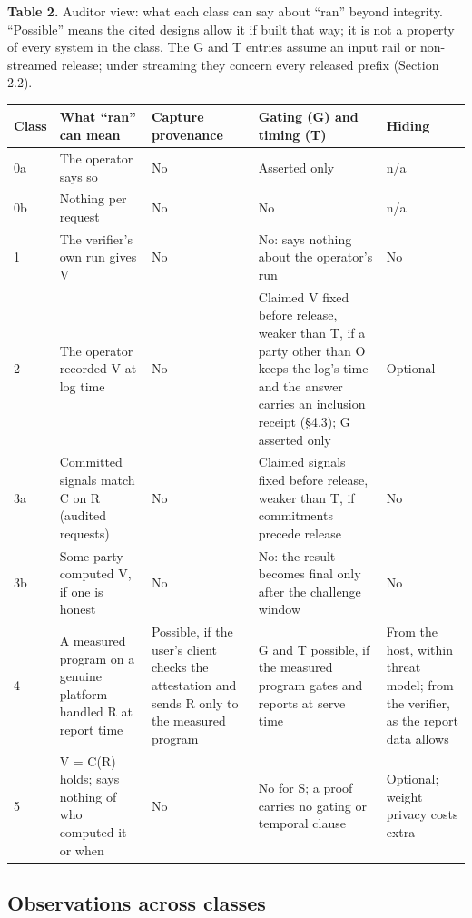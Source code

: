 \documentclass[11pt]{article}
\begin{document}
\textbf{Table 2.} Auditor view: what each class can say about ``ran'' beyond integrity. ``Possible'' means the cited designs allow it if built that way; it is not a property of every system in the class. The G and T entries assume an input rail or non-streamed release; under streaming they concern every released prefix (Section 2.2).

{\small
\begin{xltabular}{\linewidth}{XXXXX}
\toprule
\textbf{Class} & \textbf{What ``ran'' can mean} & \textbf{Capture provenance} & \textbf{Gating (G) and timing (T)} & \textbf{Hiding} \\ \midrule
\endhead
0a & The operator says so & No & Asserted only & n/a \\
0b & Nothing per request & No & No & n/a \\
1 & The verifier's own run gives V & No & No: says nothing about the operator's run & No \\
2 & The operator recorded V at log time & No & Claimed V fixed before release, weaker than T, if a party other than O keeps the log's time and the answer carries an inclusion receipt (\S{}4.3); G asserted only & Optional \\
3a & Committed signals match C on R (audited requests) & No & Claimed signals fixed before release, weaker than T, if commitments precede release & No \\
3b & Some party computed V, if one is honest & No & No: the result becomes final only after the challenge window & No \\
4 & A measured program on a genuine platform handled R at report time & Possible, if the user's client checks the attestation and sends R only to the measured program & G and T possible, if the measured program gates and reports at serve time & From the host, within threat model; from the verifier, as the report data allows \\
5 & V = C(R) holds; says nothing of who computed it or when & No & No for S; a proof carries no gating or temporal clause & Optional; weight privacy costs extra \\
\bottomrule
\end{xltabular}}

\subsection{Observations across classes}
\end{document}
